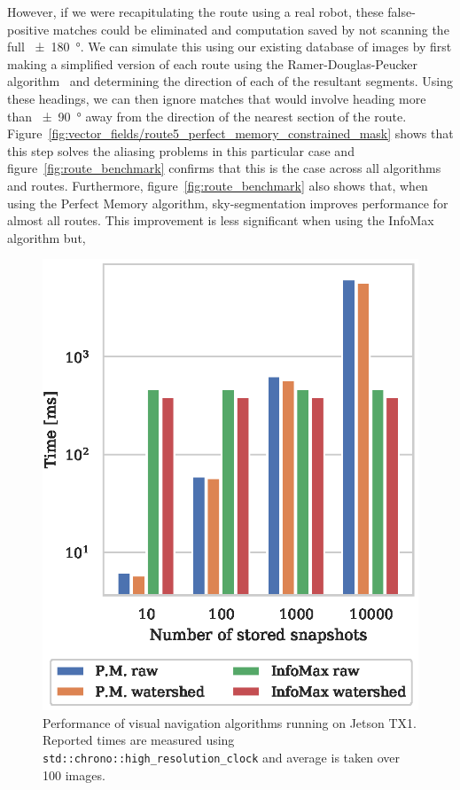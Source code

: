 \documentclass[letterpaper]{article}
\begin{document}
However, if we were recapitulating the route using a real robot, these false-positive matches could be eliminated and computation saved by not scanning the full \SI{\pm 180}{\degree}. 
We can simulate this using our existing database of images by first making a simplified version of each route using the Ramer-Douglas-Peucker algorithm~\citep{Ramer1972} and determining the direction of each of the resultant segments.
Using these headings, we can then ignore matches that would involve heading more than \SI{\pm 90}{\degree} away from the direction of the nearest section of the route.
Figure~\ref{fig:vector_fields/route5_perfect_memory_constrained_mask} shows that this step solves the aliasing problems in this particular case and figure~\ref{fig:route_benchmark} confirms that this is the case across all algorithms and routes.
Furthermore, figure~\ref{fig:route_benchmark} also shows that, when using the Perfect Memory algorithm, sky-segmentation improves performance for almost all routes.
This improvement is less significant when using the InfoMax algorithm but, 

\begin{figure}[t]
    \centering
    \includegraphics{figures/jetson_test_performance.eps}
    \caption{Performance of visual navigation algorithms running on Jetson TX1. 
    Reported times are measured using \lstinline{std::chrono::high_resolution_clock} and average is taken over \num{100} images.}
    \label{fig:jetson_test_performance}
\end{figure}
\end{document}
